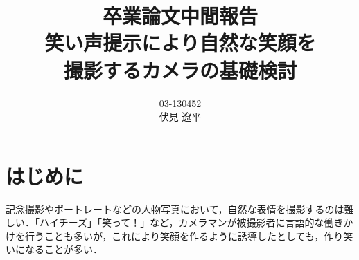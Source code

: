 \documentclass[report,10pt,uplatex,titlepage]{jsarticle}
\begin{document}
\title{卒業論文中間報告\vspace{5mm}\\笑い声提示により自然な笑顔を\\撮影するカメラの基礎検討}
\author{03-130452\\伏見 遼平}
\maketitle

\thispagestyle{empty} %

\tableofcontents %

\thispagestyle{empty} %


\pagebreak

\section{はじめに}

\setcounter{page}{1}

記念撮影やポートレートなどの人物写真において，自然な表情を撮影するのは難しい．「ハイチーズ」「笑って！」など，カメラマンが被撮影者に言語的な働きかけを行うことも多いが，これにより笑顔を作るように誘導したとしても，作り笑いになることが多い．

\end{document}
